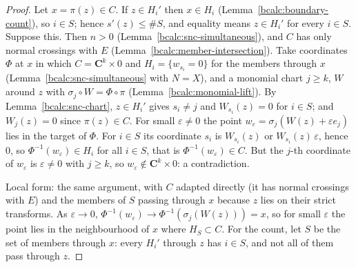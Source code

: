 \begin{proof}
\upstreamleanok
Let \(x=\pi(z)\in C\). If \(z\in H_i'\) then \(x\in H_i\) (Lemma~\ref{bcalc:boundary-count}), so \(i\in S\); hence \(s'(z)\le\#S\), and equality
means \(z\in H_i'\) for every \(i\in S\). Suppose this. Then \(n>0\) (Lemma~\ref{bcalc:snc-simultaneous}), and \(C\) has only normal crossings with
\(E\) (Lemma~\ref{bcalc:member-intersection}). Take coordinates \(\Phi\) at \(x\) in which \(C=\mathbf C^k\times0\) and \(H_i=\{w_{s_i}=0\}\) for the
members through \(x\) (Lemma~\ref{bcalc:snc-simultaneous} with \(N=X\)), and a monomial chart \(j\ge k\), \(W\) around \(z\) with
\(\sigma_j\circ W=\Phi\circ\pi\) (Lemma~\ref{bcalc:monomial-lift}). By Lemma~\ref{bcalc:snc-chart}, \(z\in H_i'\) gives \(s_i\neq j\) and
\(W_{s_i}(z)=0\) for \(i\in S\); and \(W_j(z)=0\) since \(\pi(z)\in C\). For small \(\varepsilon\neq0\) the point \(w_\varepsilon=\sigma_j(W(z)+\varepsilon e_j)\)
lies in the target of \(\Phi\). For \(i\in S\) its coordinate \(s_i\) is \(W_{s_i}(z)\) or \(W_{s_i}(z)\,\varepsilon\), hence \(0\), so
\(\Phi^{-1}(w_\varepsilon)\in H_i\) for all \(i\in S\), that is \(\Phi^{-1}(w_\varepsilon)\in C\). But the \(j\)-th coordinate of \(w_\varepsilon\) is
\(\varepsilon\neq0\) with \(j\ge k\), so \(w_\varepsilon\notin\mathbf C^k\times0\): a contradiction.

Local form: the same argument, with \(C\) adapted directly (it has normal crossings with \(E\)) and the members of \(S\) passing through \(x\)
because \(z\) lies on their strict transforms. As \(\varepsilon\to0\), \(\Phi^{-1}(w_\varepsilon)\to\Phi^{-1}(\sigma_j(W(z)))=x\), so for small
\(\varepsilon\) the point lies in the neighbourhood of \(x\) where \(H_S\subset C\). For the count, let \(S\) be the set of members through \(x\): every
\(H_i'\) through \(z\) has \(i\in S\), and not all of them pass through \(z\).
\end{proof}

